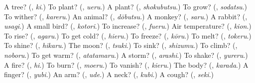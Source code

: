 \begin{tcolorbox}[breakable,colback=teal!4,colframe=teal!35!black,title={Before you move on}]
A tree? (\textbf{}, \emph{ki}.) To plant? (\textbf{}, \emph{ueru}.) A plant? (\textbf{}, \emph{shokubutsu}.) To grow? (\textbf{}, \emph{sodatsu}.) To wither? (\textbf{}, \emph{kareru}.) An animal? (\textbf{}, \emph{dōbutsu}.) A monkey? (\textbf{}, \emph{saru}.) A rabbit? (\textbf{}, \emph{usagi}.) A small bird? (\textbf{}, \emph{kotori}.) To increase? (\textbf{}, \emph{fueru}.) Air temperature? (\textbf{}, \emph{kion}.) To rise? (\textbf{}, \emph{agaru}.) To get cold? (\textbf{}, \emph{hieru}.) To freeze? (\textbf{}, \emph{kōru}.) To melt? (\textbf{}, \emph{tokeru}.) To shine? (\textbf{}, \emph{hikaru}.) The moon? (\textbf{}, \emph{tsuki}.) To sink? (\textbf{}, \emph{shizumu}.) To climb? (\textbf{}, \emph{noboru}.) To get warm? (\textbf{}, \emph{atatamaru}.) A storm? (\textbf{}, \emph{arashi}.) To shake? (\textbf{}, \emph{yureru}.) A fire? (\textbf{}, \emph{hi}.) To burn? (\textbf{}, \emph{moeru}.) To vanish? (\textbf{}, \emph{kieru}.) The body? (\textbf{}, \emph{karada}.) A finger? (\textbf{}, \emph{yubi}.) An arm? (\textbf{}, \emph{ude}.) A neck? (\textbf{}, \emph{kubi}.) A cough? (\textbf{}, \emph{seki}.)
\end{tcolorbox}
